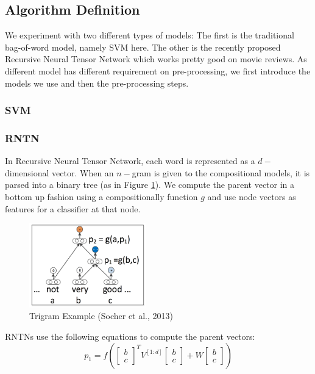 \subsection{Algorithm Definition}
We experiment with two different types of models: The first is the traditional bag-of-word model, namely SVM here. The other is the recently proposed Recursive Neural Tensor Network which works pretty good on movie reviews. As different model has different requirement on pre-processing, we first introduce the models we use and then the pre-processing steps. 


\subsubsection{SVM}
\label{svm}

\newpage

\subsubsection{RNTN}
In Recursive Neural Tensor Network, each word is represented as a $d-$dimensional vector. When an $n-$gram is given to the compositional models, it is parsed into a binary tree (as in Figure \ref{trigram}). We compute the parent vector in a bottom up fashion using a compositionally function $g$ and use node vectors as features for a classifier at that node. 
\begin{figure}[H]
\begin{center}
\includegraphics[width = 0.45\textwidth]{pic/trigram.png}
\caption{\label{trigram}Trigram Example (Socher et al., 2013) }
\end{center}
\end{figure}

RNTNs use the following equations to compute the parent vectors: 
\begin{equation*}
p_1 = f \left(  
\begin{bmatrix}
b \\ c
\end{bmatrix}^T
V^{[1:d]} 
\begin{bmatrix}
b \\ c
\end{bmatrix}
+ W
\begin{bmatrix}
b \\ c
\end{bmatrix}
 \right)
\end{equation*}
 
